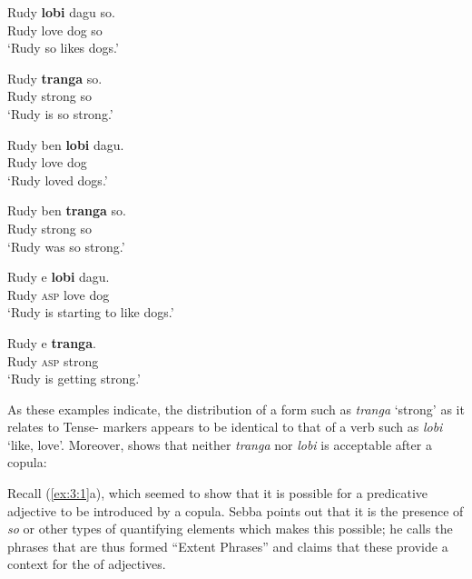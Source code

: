 \ea%
\label{ex:3:2}
\ea
\gll Rudy \textbf{lobi} dagu so.\\
     Rudy         love dog so\\
\glt `Rudy so likes dogs.'

\ex
\gll Rudy \textbf{tranga} so.\\
     Rudy         strong  so\\
\glt `Rudy is so strong.'\z \z

\ea%
\label{ex:3:3}
\ea
\gll Rudy ben \textbf{lobi} dagu.\\
    Rudy {\TNS} love dog \\
\glt `Rudy loved dogs.'

\ex
\gll Rudy ben \textbf{tranga} so.\\
     Rudy {\TNS} strong so\\
\glt `Rudy was so strong.'\z \z

\ea%
\label{ex:3:4}
\ea
\gll Rudy              e \textbf{lobi} dagu.\\
          Rudy \textsc{asp}      love dog\\
\glt `Rudy is starting to like dogs.'

\ex
\gll Rudy                  e \textbf{tranga}. \\
        Rudy \textsc{asp} strong\\
\glt `Rudy is getting strong.'\z \z

As these examples indicate, the distribution of a form such as
\textit{tranga} `strong' as it relates to Tense- markers
appears to be identical to that of a  verb such as
\textit{lobi} `like, love'.  Moreover,  shows that neither
\textit{tranga} nor \textit{lobi} is acceptable after a copula:

\ea%
\label{ex:3:5}

\z \z

Recall (\ref{ex:3:1}a), which seemed to show that it is possible for a
predicative adjective to be introduced by a copula.  Sebba points out
that it is the presence of \textit{so} or other types of quantifying elements
which makes this possible; he calls the phrases that are thus formed
``Extent Phrases” and claims that these provide a context for the
 of adjectives.

